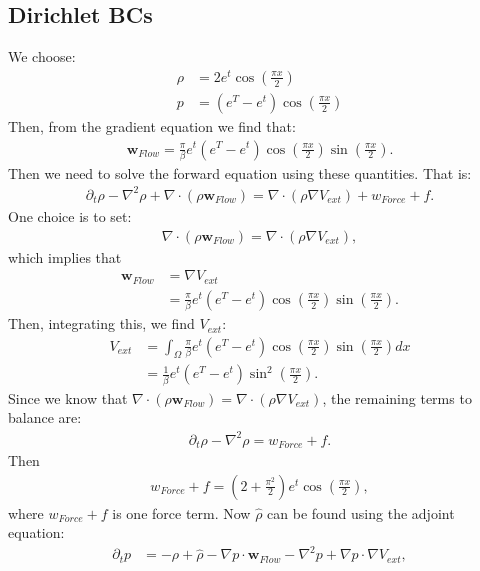\documentclass[11pt, a4paper]{article}
\theoremstyle{definition}
\newcommand{\Sta}{\rho}
\newcommand{\Adj}{p}
\begin{document}
\subsection*{Dirichlet BCs}
We choose:
\begin{align*}
\Sta &= 2 e^t \cos(\frac{\pi x}{2})\\
\Adj &=(e^T-e^t) \cos(\frac{\pi x}{2})
\end{align*}
Then, from the gradient equation we find that:
\begin{align*}
\mathbf{w}_{Flow }= \frac{\pi}{\beta}e^t(e^T -e^t)\cos(\frac{\pi x}{2}) \sin(\frac{\pi x}{2}).
\end{align*}
Then we need to solve the forward equation using these quantities. That is:
\begin{align*}
\partial_t \Sta - \nabla^2 \Sta + \nabla \cdot (\rho \mathbf{w}_{Flow}) = \nabla \cdot (\Sta \nabla V_{ext}) +{w}_{Force} + f.
\end{align*}
One choice is to set:
\begin{align*}
\nabla \cdot (\rho \mathbf{w}_{Flow}) = \nabla \cdot (\Sta \nabla V_{ext}),
\end{align*}
which implies that
\begin{align*}
 \mathbf{w}_{Flow} &= \nabla V_{ext} \\
 &=\frac{\pi}{\beta}e^t(e^T -e^t)\cos(\frac{\pi x}{2}) \sin(\frac{\pi x}{2}).
\end{align*}
Then, integrating this, we find $V_{ext}$:
\begin{align*}
V_{ext} &= \int_\Omega \frac{\pi}{\beta}e^t(e^T -e^t)\cos(\frac{\pi x}{2}) \sin(\frac{\pi x}{2}) dx\\
&=\frac{1}{\beta}e^t(e^T -e^t)\sin^2(\frac{\pi x}{2}).
\end{align*}
Since we know that $\nabla \cdot (\rho \mathbf{w}_{Flow}) = \nabla \cdot (\Sta \nabla V_{ext})$, the remaining terms to balance are:
\begin{align*}
\partial_t \Sta - \nabla^2 \Sta  = {w}_{Force} + f.
\end{align*}
Then
\begin{align*}
 {w}_{Force} + f = (2 + \frac{\pi^2}{2}) e^t \cos(\frac{\pi x}{2}), 
\end{align*}
where ${w}_{Force} + f$ is one force term.
Now $\hat \Sta $ can be found using the adjoint equation:
\begin{align*}
\partial_t \Adj &=- \Sta + \hat \Sta -  \nabla \Adj \cdot \mathbf w_{Flow} -  \nabla^2 \Adj +  \nabla \Adj \cdot \nabla V_{ext},
\end{align*}
\end{document}
